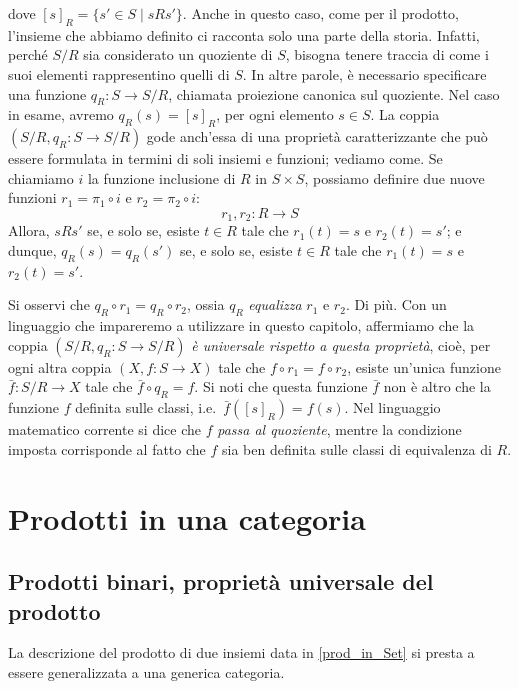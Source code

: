 dove \([s]_R=\{s'\in S\mid sRs'\}\). Anche in questo caso, come per il prodotto, l'insieme che abbiamo definito ci racconta solo una parte della storia. Infatti, perché \(S/R\) sia considerato un quoziente di \(S\), bisogna tenere traccia di come i suoi elementi rappresentino quelli di \(S\). In altre parole, è necessario specificare una funzione \(q_R\colon S\to S/R\),  chiamata proiezione canonica sul quoziente. Nel caso in esame, avremo \(q_R(s)=[s]_R\), per ogni elemento \(s\in S\). La coppia \((S/R, q_R\colon S\to S/R)\) gode anch'essa di una proprietà caratterizzante che può essere formulata in termini di soli insiemi e funzioni; vediamo come.  Se chiamiamo $i$ la funzione inclusione di \(R\) in \(S\times  S\), possiamo definire due nuove funzioni \(r_1=\pi_1\circ i\) e \(r_2=\pi_2\circ i\):
\[
	r_1, r_2\colon R\to S
\]
Allora, \(s R s'\) se, e solo se, esiste \(t\in R\) tale che \(r_1(t)=s\) e \(r_2(t)=s'\); e dunque, \(q_R(s)=q_R(s')\) se, e solo se, esiste \(t\in R\) tale che \(r_1(t)=s\) e \(r_2(t)=s'\).

Si osservi che \(q_R\circ r_1=q_R\circ r_2 \), ossia \(q_R\) \emph{equalizza} \(r_1\) e \(r_2\). Di più. Con un linguaggio che impareremo a utilizzare in questo capitolo, affermiamo che la coppia \((S/R,q_R\colon S\to S/R)\) \emph{è universale rispetto a questa proprietà}, cioè, per ogni altra coppia \((X,f\colon S\to X)\) tale che  \(f\circ r_1=f\circ r_2 \), esiste un'unica funzione \(\bar f\colon S/R\to X\) tale che \(\bar f\circ q_R= f\). Si noti che questa funzione \(\bar f\) non è altro che la funzione \(f\) definita sulle classi, i.e.\ \(\bar f([s]_R)= f(s)\). Nel linguaggio matematico corrente si dice che \(f\) \emph{passa al quoziente}, mentre la condizione imposta corrisponde al fatto che \(f\) sia ben definita sulle classi di equivalenza di \(R\).


\section{Prodotti  in una categoria}

\subsection{Prodotti binari, proprietà universale del prodotto}
La descrizione del prodotto di due insiemi data in \ref{prod_in_Set} si presta a essere generalizzata a una generica categoria.

